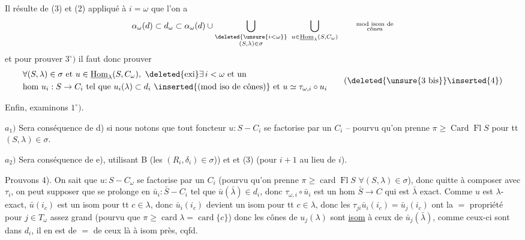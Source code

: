 
Il résulte de (3) et (2) appliqué à $i=\omega$ que l'on a
\[
 \alpha_\omega(d)\subset d_\omega\subset\alpha_\omega(d)\cup
 \bigcup_{\substack{\deleted{\unsure{i<\omega}}\\(S,\lambda)\in\sigma}}
 \ \bigcup_{u\in\underline{\mathrm{Hom}}_\lambda(S,C_\omega)}
 \qquad\substack{\text{mod isom de}\\\text{cônes}}
\]
et pour prouver $3^\circ)$ il faut donc prouver
\[
 \begin{aligned}
 &\forall(S,\lambda)\in\sigma\text{ et }u\in\underline{\mathrm{Hom}}_\lambda(S,C_\omega),
 \ \deleted{\text{exi}}\exists\,i<\omega\text{ et un}\\
 &\text{hom }u_i:S\to C_i\text{ tel que }u_i(\lambda)\subset d_i\ \inserted{\text{(mod iso de cônes)}}
 \text{ et }u\simeq\tau_{\omega,i}\circ u_i
 \end{aligned}\tag*{(\deleted{\unsure{3 bis}}\inserted{4})}
\]

Enfin,  examinons $1^\circ)$. 

$a_1)$ Sera conséquence de d) si nous notons que tout foncteur $u:S-C_i$ se factorise par un $C_i$ -- pourvu qu'on prenne $\pi\geq\operatorname{Card}\operatorname{Fl}S$ pour tt $(S,\lambda)\in\sigma$.

$a_2)$ Sera conséquence de e), utilisant B (les $(R_i,\delta_i)\in\sigma$)) et  et (3) (pour $i+1$ au lieu de $i$).



Prouvons 4). On sait que $u:S-C_\omega$ se factorise par un  $C_i$ (pourvu qu'on prenne $\pi\geq\operatorname{card}\operatorname{Fl}S$ $\forall(S,\lambda)\in\sigma$), donc quitte à composer avec $\tau_i$, on peut supposer que  se prolonge en $\bar u_i:\bar S-C_i$ tel que $\bar u(\bar\lambda)\in d_i$, donc $\tau_{\omega,i}\circ\bar u_i$ est un hom $\bar S\to C$ qui est $\bar\lambda$ exact.   Comme
$u$ est $\lambda$-exact, $\bar u(i_c)$ est un isom pour tt $c\in\lambda$, donc $\bar u_i(i_c)$ devient un isom pour tt $c\in\lambda$, donc les $\tau_{ji}\bar u_i(i_c)=\bar u_j(i_c)$ ont la $=$ propriété pour $j\in T_\omega$ assez grand (pourvu que $\pi\geq\operatorname{card}\lambda=\operatorname{card}\{c\}$) donc  les  cônes de $u_j(\lambda)$ sont \uline{isom} à ceux de $\bar u_j(\bar\lambda)$, comme ceux-ci sont dans $d_i$, il en est de $=$ de ceux là à isom près, cqfd.
